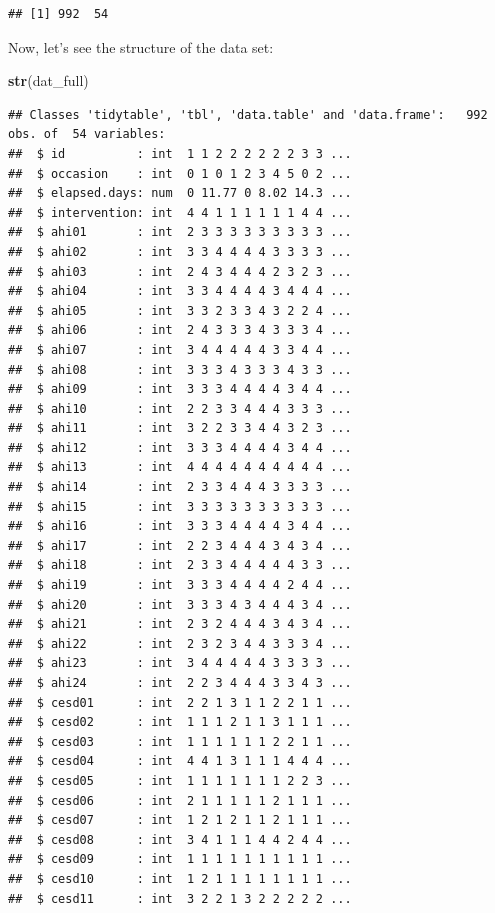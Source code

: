 \documentclass[
]{article}
\newenvironment{Shaded}{\begin{snugshade}}{\end{snugshade}}
\newcommand{\FunctionTok}[1]{\textcolor[rgb]{0.13,0.29,0.53}{\textbf{#1}}}
\newcommand{\NormalTok}[1]{#1}
\begin{document}
\begin{verbatim}
## [1] 992  54
\end{verbatim}

Now, let's see the structure of the data set:

\begin{Shaded}
\begin{Highlighting}[]
\FunctionTok{str}\NormalTok{(dat\_full)}
\end{Highlighting}
\end{Shaded}

\begin{verbatim}
## Classes 'tidytable', 'tbl', 'data.table' and 'data.frame':   992 obs. of  54 variables:
##  $ id          : int  1 1 2 2 2 2 2 2 3 3 ...
##  $ occasion    : int  0 1 0 1 2 3 4 5 0 2 ...
##  $ elapsed.days: num  0 11.77 0 8.02 14.3 ...
##  $ intervention: int  4 4 1 1 1 1 1 1 4 4 ...
##  $ ahi01       : int  2 3 3 3 3 3 3 3 3 3 ...
##  $ ahi02       : int  3 3 4 4 4 4 3 3 3 3 ...
##  $ ahi03       : int  2 4 3 4 4 4 2 3 2 3 ...
##  $ ahi04       : int  3 3 4 4 4 4 3 4 4 4 ...
##  $ ahi05       : int  3 3 2 3 3 4 3 2 2 4 ...
##  $ ahi06       : int  2 4 3 3 3 4 3 3 3 4 ...
##  $ ahi07       : int  3 4 4 4 4 4 3 3 4 4 ...
##  $ ahi08       : int  3 3 3 4 3 3 3 4 3 3 ...
##  $ ahi09       : int  3 3 3 4 4 4 4 3 4 4 ...
##  $ ahi10       : int  2 2 3 3 4 4 4 3 3 3 ...
##  $ ahi11       : int  3 2 2 3 3 4 4 3 2 3 ...
##  $ ahi12       : int  3 3 3 4 4 4 4 3 4 4 ...
##  $ ahi13       : int  4 4 4 4 4 4 4 4 4 4 ...
##  $ ahi14       : int  2 3 3 4 4 4 3 3 3 3 ...
##  $ ahi15       : int  3 3 3 3 3 3 3 3 3 3 ...
##  $ ahi16       : int  3 3 3 4 4 4 4 3 4 4 ...
##  $ ahi17       : int  2 2 3 4 4 4 3 4 3 4 ...
##  $ ahi18       : int  2 3 3 4 4 4 4 4 3 3 ...
##  $ ahi19       : int  3 3 3 4 4 4 4 2 4 4 ...
##  $ ahi20       : int  3 3 3 4 3 4 4 4 3 4 ...
##  $ ahi21       : int  2 3 2 4 4 4 3 4 3 4 ...
##  $ ahi22       : int  2 3 2 3 4 4 3 3 3 4 ...
##  $ ahi23       : int  3 4 4 4 4 4 3 3 3 3 ...
##  $ ahi24       : int  2 2 3 4 4 4 3 3 4 3 ...
##  $ cesd01      : int  2 2 1 3 1 1 2 2 1 1 ...
##  $ cesd02      : int  1 1 1 2 1 1 3 1 1 1 ...
##  $ cesd03      : int  1 1 1 1 1 1 2 2 1 1 ...
##  $ cesd04      : int  4 4 1 3 1 1 1 4 4 4 ...
##  $ cesd05      : int  1 1 1 1 1 1 1 2 2 3 ...
##  $ cesd06      : int  2 1 1 1 1 1 2 1 1 1 ...
##  $ cesd07      : int  1 2 1 2 1 1 2 1 1 1 ...
##  $ cesd08      : int  3 4 1 1 1 4 4 2 4 4 ...
##  $ cesd09      : int  1 1 1 1 1 1 1 1 1 1 ...
##  $ cesd10      : int  1 2 1 1 1 1 1 1 1 1 ...
##  $ cesd11      : int  3 2 2 1 3 2 2 2 2 2 ...

\end{verbatim}
\end{document}
